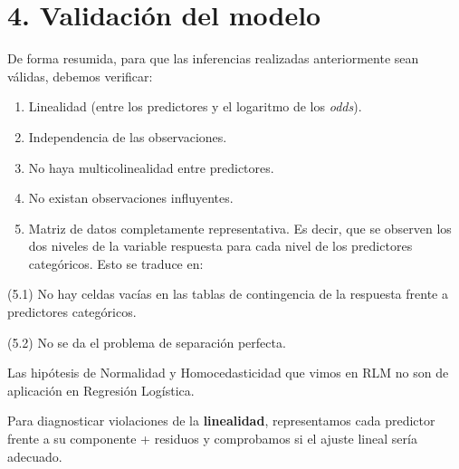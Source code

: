 \documentclass[
]{article}
\begin{document}
\hypertarget{validaciuxf3n-del-modelo}{%
\section{4. Validación del modelo}\label{validaciuxf3n-del-modelo}}

De forma resumida, para que las inferencias realizadas anteriormente
sean válidas, debemos verificar:

\begin{enumerate}
\def\labelenumi{\arabic{enumi})}
\item
  Linealidad (entre los predictores y el logaritmo de los \emph{odds}).
\item
  Independencia de las observaciones.
\item
  No haya multicolinealidad entre predictores.
\item
  No existan observaciones influyentes.
\item
  Matriz de datos completamente representativa. Es decir, que se
  observen los dos niveles de la variable respuesta para cada nivel de
  los predictores categóricos. Esto se traduce en:
\end{enumerate}

(5.1) No hay celdas vacías en las tablas de contingencia de la respuesta
frente a predictores categóricos.

(5.2) No se da el problema de separación perfecta.

Las hipótesis de Normalidad y Homocedasticidad que vimos en RLM no son
de aplicación en Regresión Logística.

Para diagnosticar violaciones de la \textbf{linealidad}, representamos
cada predictor frente a su componente + residuos y comprobamos si el
ajuste lineal sería adecuado.
\end{document}
